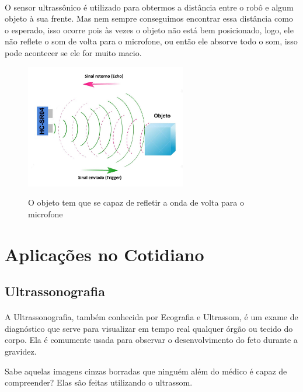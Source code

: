     \paragraph{}
    O sensor ultrassônico é utilizado para obtermos a distância entre o robô e algum objeto à sua frente. Mas nem sempre conseguimos encontrar essa distância como o esperado, isso ocorre pois às vezes o objeto não está bem posicionado, logo, ele não reflete o som de volta para o microfone, ou então ele absorve todo o som, isso pode acontecer se ele for muito macio.
    
    \begin{figure}[h]
    \caption{O objeto tem que se capaz de refletir a onda de volta para o microfone}
     
    \centering 
    \includegraphics[width=7cm]{Figuras/onda.jpg}
    \label{figura:onda.jpeg}
    \end{figure}
    
\section{Aplicações no Cotidiano}

    \subsection*{Ultrassonografia}
    \paragraph{}
        A Ultrassonografia, também conhecida por Ecografia e Ultrassom, é um exame de diagnóstico que serve para visualizar em tempo real qualquer órgão ou tecido do corpo. Ela é comumente usada para observar o desenvolvimento do feto durante a gravidez. \par 
        Sabe aquelas imagens cinzas borradas que ninguém além do médico é capaz de compreender? Elas são feitas utilizando o ultrassom.
        
